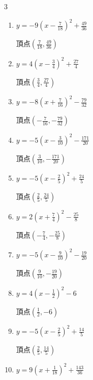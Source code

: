 \begin{multicols}{3}
\begin{enumerate}
\columnbreak %

  \item $\displaystyle y=-9\left( x-\frac{7}{18}\right)^{2}+\frac{49}{36}$

        $\displaystyle 頂点\left( \frac{7}{18} , \frac{49}{36} \right)$

  \item $\displaystyle y=4\left( x-\frac{3}{4}\right)^{2}+\frac{27}{4}$

        $\displaystyle 頂点\left( \frac{3}{4} , \frac{27}{4} \right)$

  \item $\displaystyle y=-8\left( x+\frac{7}{16}\right)^{2}-\frac{79}{32}$

        $\displaystyle 頂点\left( -\frac{7}{16} , -\frac{79}{32} \right)$

  \item $\displaystyle y=-5\left( x-\frac{3}{10}\right)^{2}-\frac{171}{20}$

        $\displaystyle 頂点\left( \frac{3}{10} , -\frac{171}{20} \right)$

  \item $\displaystyle y=-5\left( x-\frac{2}{5}\right)^{2}+\frac{24}{5}$

        $\displaystyle 頂点\left( \frac{2}{5} , \frac{24}{5} \right)$

  \item $\displaystyle y=2\left( x+\frac{7}{4}\right)^{2}-\frac{25}{8}$

        $\displaystyle 頂点\left( -\frac{7}{4} , -\frac{25}{8} \right)$

  \item $\displaystyle y=-5\left( x-\frac{9}{10}\right)^{2}-\frac{19}{20}$

        $\displaystyle 頂点\left( \frac{9}{10} , -\frac{19}{20} \right)$

  \item $\displaystyle y=4\left( x-\frac{1}{2}\right)^{2}-6$

        $\displaystyle 頂点\left( \frac{1}{2} , -6 \right)$

  \item $\displaystyle y=-5\left( x-\frac{2}{5}\right)^{2}+\frac{14}{5}$

        $\displaystyle 頂点\left( \frac{2}{5} , \frac{14}{5} \right)$

  \item $\displaystyle y=9\left( x+\frac{1}{18}\right)^{2}+\frac{143}{36}$


\end{enumerate}
\end{multicols}
